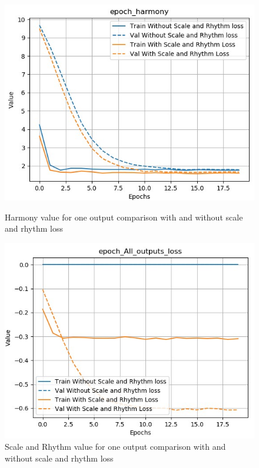 \documentclass[12pt]{report}
\begin{document}
\begin{figure}[htbp]
    \begin{minipage}{0.5\textwidth}
        \begin{center}
            \includegraphics[width=\textwidth]{images/experiences/scale-rhythm-rnn/harmony-comparison-scale-rhythm.jpg}
            \caption{Harmony value for one output comparison with and without scale and rhythm loss}
            \label{fig:exp:scale-rhythm:harmony-comparison}
        \end{center}
    \end{minipage} \hfill
    \begin{minipage}{0.5 \textwidth}
        \begin{center}
            \includegraphics[width=\textwidth]{images/experiences/scale-rhythm-rnn/loss-all-comparison-scale-rhythm.jpg}
            \caption{Scale and Rhythm value for one output comparison with and without scale and rhythm loss}
            \label{fig:exp:scale-rhythm:all-output-comparison}
        \end{center}
    \end{minipage}
\end{figure}
\end{document}

